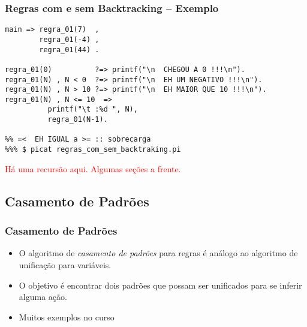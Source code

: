 \begin{frame}[fragile]
	\frametitle{Regras com e sem Backtracking -- Exemplo}


\begin{footnotesize}
\begin{verbatim}
main => regra_01(7)  ,
        regra_01(-4) ,
        regra_01(44) .
        
regra_01(0)          ?=> printf("\n  CHEGOU A 0 !!!\n").
regra_01(N) , N < 0  ?=> printf("\n  EH UM NEGATIVO !!!\n").
regra_01(N) , N > 10 ?=> printf("\n  EH MAIOR QUE 10 !!!\n").
regra_01(N) , N <= 10  =>  
          printf("\t :%d ", N),
          regra_01(N-1).

%% =<  EH IGUAL a >= :: sobrecarga
%%% $ picat regras_com_sem_backtraking.pi

\end{verbatim}

\end{footnotesize}
\textcolor{red}{Há uma recursão aqui. Algumas seções a frente.}

\end{frame}



\subsection{Casamento de Padrões}

\begin{frame}[fragile]
\frametitle{Casamento de Padrões}

\begin{itemize}

\item O algoritmo de {\em casamento de padrões} para regras é análogo ao algoritmo de    unificação para variáveis. 

\item O objetivo é encontrar dois padrões que possam ser unificados para se inferir alguma ação.

\pause
\item Muitos exemplos no curso

\end{itemize}
\end{frame}



